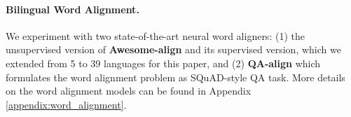 \documentclass[11pt,dvipsnames]{article}
\begin{document}
\vspace{-2.5pt}
\paragraph{Bilingual Word Alignment.} We experiment with two state-of-the-art neural word aligners: (1) the unsupervised version of \textbf{Awesome-align} \cite{dou2021awesome} and its supervised version, which we extended from 5 to 39 languages for this paper, and (2) \textbf{QA-align} \cite{nagata2020supervised} which formulates the word alignment problem as SQuAD-style QA task. More details on the 
 word alignment models  can be found in Appendix \ref{appendix:word_alignment}. 




\renewcommand{\arraystretch}{1.1}
\begin{table}[b!]
\centering
\small
\vspace{-10pt}
\vspace{-5pt}
\caption{Average results over 18 African languages on the MasaKhaNER 2.0 corpus, as two languages are not supported by NLLB model.   The mDeBERTa model is used here sinces it has   the strongest performance on African languages in  the original paper \cite{adelani2022masakhaner}, where the ``Ref'' column  is from. Full results on each languages are in Table \ref{table:results-on-masakha2} in Appendix \ref{sec:results-on-masakha2}
.}
\vspace{-5pt}
\label{table:masakha}
\end{table}
\end{document}
